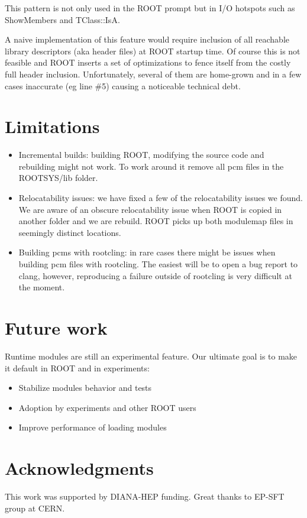 \documentclass{webofc}
\begin{document}
This pattern is not only used in the ROOT prompt but in I/O hotspots such as ShowMembers and TClass::IsA.

A naive implementation of this feature would require inclusion of all reachable library descriptors (aka header files) at ROOT startup time. Of course this is not feasible and ROOT inserts a set of optimizations to fence itself from the costly full header inclusion. Unfortunately, several of them are home-grown and in a few cases inaccurate (eg line \#5) causing a noticeable technical debt.

\section{Limitations}
\begin{itemize}
\item Incremental builds: building ROOT, modifying the source code and rebuilding might not work. To work around it remove all pcm files in the ROOTSYS/lib folder.

\item Relocatability issues: we have fixed a few of the relocatability issues we
found. We are aware of an obscure relocatability issue when ROOT is copied in another folder and we are rebuild. ROOT picks up both modulemap files in seemingly distinct locations.

\item Building pcms with rootcling: in rare cases there might be issues when building pcm files with rootcling. The easiest will be to open a bug report to clang, however, reproducing a failure outside of rootcling is very difficult at the moment.
\end{itemize}

\section{Future work}
Runtime modules are still an experimental feature. Our ultimate goal is to make it default in ROOT and in experiments:

\begin{itemize}
    \item Stabilize modules behavior and tests
    \item Adoption by experiments and other ROOT users
    \item Improve performance of loading modules
\end{itemize}


\section{Acknowledgments}
This work was supported by DIANA-HEP funding. Great thanks to EP-SFT group at CERN.
\end{document}
